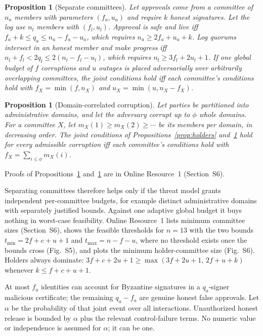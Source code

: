 \documentclass[pdflatex,sn-mathphys-num]{sn-jnl}%
\theoremstyle{plain}
\newtheorem{proposition}[theorem]{Proposition}
\theoremstyle{definition}
\begin{document}
\begin{proposition}[Separate committees]\label{prop:committees}
Let approvals come from a committee of $n_a$ members with parameters $(f_a,u_a)$ and require $k$ honest signatures. Let the log use $n_l$ members with $(f_l,u_l)$. Approval is safe and live iff $f_a+k\le q_a\le n_a-f_a-u_a$, which requires $n_a\ge2f_a+u_a+k$. Log quorums intersect in an honest member and make progress iff $n_l+f_l<2q_l\le2(n_l-f_l-u_l)$, which requires $n_l\ge3f_l+2u_l+1$. If one global budget of $f$ corruptions and $u$ outages is placed adversarially over arbitrarily overlapping committees, the joint conditions hold iff each committee's conditions hold with $f_X=\min(f,n_X)$ and $u_X=\min(u,n_X-f_X)$.
\end{proposition}

\begin{proposition}[Domain-correlated corruption]\label{prop:domains}
Let parties be partitioned into administrative domains, and let the adversary corrupt up to $\phi$ whole domains. For a committee $X$, let $m_X(1)\ge m_X(2)\ge\cdots$ be its members per domain, in decreasing order. The joint conditions of Propositions~\ref{prop:holders} and~\ref{prop:committees} hold for every admissible corruption iff each committee's conditions hold with $f_X=\sum_{i\le\phi}m_X(i)$.
\end{proposition}
Proofs of Propositions~\ref{prop:committees} and~\ref{prop:domains} are in Online Resource~1 (Section~S6).

Separating committees therefore helps only if the threat model grants independent per-committee budgets, for example distinct administrative domains with separately justified bounds. Against one adaptive global budget it buys nothing in worst-case feasibility. Online Resource~1 lists minimum committee sizes (Section~S6), shows the feasible thresholds for $n=13$ with the two bounds $t_{\min}=2f+c+u+1$ and $t_{\max}=n-f-u$, where no threshold exists once the bounds cross (Fig.~S5), and plots the minimum holder-committee size (Fig.~S6). Holders always dominate: $3f+c+2u+1\ge\max(3f+2u+1,\,2f+u+k)$ whenever $k\le f+c+u+1$.





At most $f_a$ identities can account for Byzantine signatures in a $q_a$-signer malicious certificate; the remaining $q_a-f_a$ are genuine honest false approvals. Let $\alpha$ be the probability of that joint event over all interactions. Unauthorized honest release is bounded by $\alpha$ plus the relevant control-failure terms. No numeric value or independence is assumed for $\alpha$; it can be one.
\end{document}
